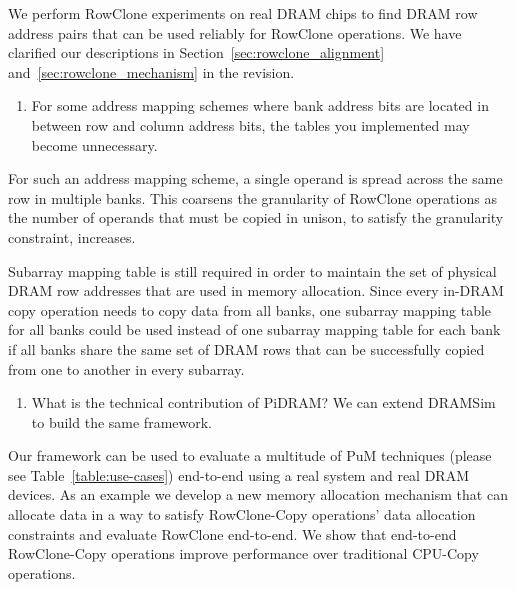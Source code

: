 We perform RowClone experiments on real DRAM chips to find DRAM row address pairs that can be used reliably for RowClone operations. We have clarified our descriptions in Section~\ref{sec:rowclone_alignment} and~\ref{sec:rowclone_mechanism} in the revision.

\bigbreak
\begin{tcolorbox}
    \begin{enumerate}[label=R2/\arabic*]
        \addtocounter{enumi}{1}
        \item \label{q:r2q2} For some address mapping schemes where bank address bits are located in between row and column address bits, the tables you implemented may become unnecessary.
    \end{enumerate}
\end{tcolorbox} 

For such an address mapping scheme, a single operand is spread across the same row in multiple banks. This coarsens the granularity of RowClone operations as the number of operands that must be copied in unison, to satisfy the granularity constraint, increases. 

Subarray mapping table is still required in order to maintain the set of physical DRAM row addresses that are used in memory allocation. Since every in-DRAM copy operation needs to copy data from all banks, one subarray mapping table for all banks could be used instead of one subarray mapping table for each bank if all banks share the same set of DRAM rows that can be successfully copied from one to another in every subarray.

\bigbreak
\begin{tcolorbox}
    \begin{enumerate}[label=R2/\arabic*]
       \addtocounter{enumi}{2}
        \item \label{q:r2q3} What is the technical contribution of PiDRAM? We can extend DRAMSim to build the same framework.
    \end{enumerate}
\end{tcolorbox} 

Our framework can be used to evaluate a multitude of PuM techniques (please see Table~\ref{table:use-cases}) end-to-end using a real system and real DRAM devices. As an example we develop a new memory allocation mechanism that can allocate data in a way to satisfy RowClone-Copy operations’ data allocation constraints and evaluate RowClone end-to-end. We show that end-to-end RowClone-Copy operations improve performance over traditional CPU-Copy operations.

